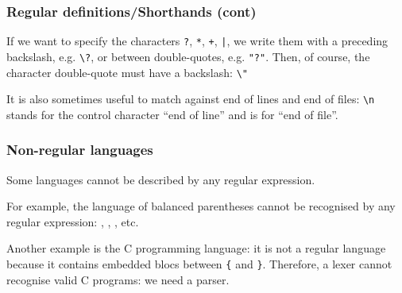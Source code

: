 % 
\begin{frame}[containsverbatim]
\frametitle{Regular definitions/Shorthands (cont)}

If we want to specify the characters \verb+?+, \verb+*+, \verb|+|,
\verb+|+, we write them with a preceding backslash, e.g. \verb|\?|,
or between double-quotes, e.g. \verb+"?"+. Then, of course, the
character double-quote must have a backslash: \verb+\"+

\bigskip

It is also sometimes useful to match against end of lines and end of
files: \verb+\n+ stands for the control character ``end of line'' and
\term{\$} is for ``end of file''.

\end{frame}

% 
\begin{frame}[containsverbatim]
\frametitle{Non-regular languages}

Some languages cannot be described by any regular expression.

\bigskip

For example, the language of balanced parentheses cannot be recognised
by any regular expression: \lparen\rparen,
\lparen\lparen\rparen\rparen, \lparen\rparen\lparen\rparen,
\lparen\lparen\lparen\rparen\rparen\lparen\rparen\rparen{} etc.

\bigskip

Another example is the C programming language: it is not a regular
language because it contains embedded blocs between \verb+{+ and
\verb+}+. Therefore, a lexer cannot recognise valid C programs: we
need a parser.

\end{frame}

